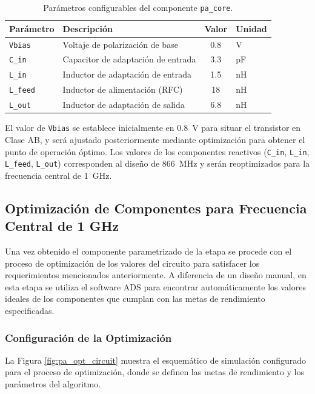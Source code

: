 \begin{table}[!htb]
\centering
\small
\caption{Parámetros configurables del componente \texttt{pa\_core}.}
\label{tab:pa_core_params}
\begin{tabular}{@{}llcl@{}}
\toprule
\textbf{Parámetro} & \textbf{Descripción} & \textbf{Valor} & \textbf{Unidad} \\
\midrule
\texttt{Vbias}   & Voltaje de polarización de base   & 0.8  & V  \\
\texttt{C\_in}   & Capacitor de adaptación de entrada & 3.3  & pF \\
\texttt{L\_in}   & Inductor de adaptación de entrada  & 1.5  & nH \\
\texttt{L\_feed} & Inductor de alimentación (RFC)     & 18   & nH \\
\texttt{L\_out}  & Inductor de adaptación de salida   & 6.8  & nH \\
\bottomrule
\end{tabular}
\end{table}

El valor de \texttt{Vbias} se establece inicialmente en \qty{0,8}{\V} para situar el transistor en Clase AB, y será ajustado posteriormente mediante optimización para obtener el punto de operación óptimo. Los valores de los componentes reactivos (\texttt{C\_in}, \texttt{L\_in}, \texttt{L\_feed}, \texttt{L\_out}) corresponden al diseño de \qty{866}{\MHz} y serán reoptimizados para la frecuencia central de \qty{1}{\GHz}.

\subsection{Optimización de Componentes para Frecuencia Central de 1 GHz}

Una vez obtenido el componente parametrizado de la etapa se procede con el proceso de optimización de los valores del circuito para satisfacer los requerimientos mencionados anteriormente. A diferencia de un diseño manual, en esta etapa se utiliza el software ADS para encontrar automáticamente los valores ideales de los componentes que cumplan con las metas de rendimiento especificadas.

\subsubsection{Configuración de la Optimización}

La Figura \ref{fig:pa_opt_circuit} muestra el esquemático de simulación configurado para el proceso de optimización, donde se definen las metas de rendimiento y los parámetros del algoritmo.


